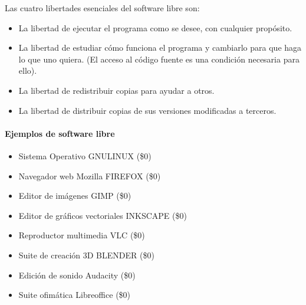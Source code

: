 \documentclass[letterpaper,10pt,spanish]{sphinxmanual}
\begin{document}
\sphinxAtStartPar
Las cuatro libertades esenciales del software libre son:
\begin{itemize}
\item {} 
\sphinxAtStartPar
{} La libertad de ejecutar el programa como se desee, con cualquier propósito.

\item {} 
\sphinxAtStartPar
{} La libertad de estudiar cómo funciona el programa y cambiarlo para que haga lo que uno quiera. (El acceso al código fuente es una condición necesaria para ello).

\item {} 
\sphinxAtStartPar
{} La libertad de redistribuir copias para ayudar a otros.

\item {} 
\sphinxAtStartPar
{} La libertad de distribuir copias de sus versiones modificadas a terceros.

\end{itemize}


\paragraph{Ejemplos de software libre}
\label{\detokenize{1_guias/10ofimatica/G1019:ejemplos-de-software-libre}}\begin{itemize}
\item {} 
\sphinxAtStartPar
Sistema Operativo GNU\sphinxhyphen{}LINUX (\$0)

\item {} 
\sphinxAtStartPar
Navegador web Mozilla FIREFOX (\$0)

\item {} 
\sphinxAtStartPar
Editor de imágenes GIMP (\$0)

\item {} 
\sphinxAtStartPar
Editor de gráficos vectoriales INKSCAPE (\$0)

\item {} 
\sphinxAtStartPar
Reproductor multimedia VLC (\$0)

\item {} 
\sphinxAtStartPar
Suite de creación 3D BLENDER (\$0)

\item {} 
\sphinxAtStartPar
Edición de sonido Audacity (\$0)

\item {} 
\sphinxAtStartPar
Suite ofimática Libreoffice (\$0)

\end{itemize}
\end{document}
